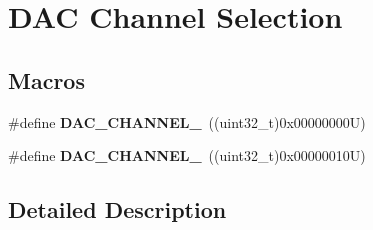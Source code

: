 \hypertarget{group___d_a_c___channel__selection}{}\section{D\+AC Channel Selection}
\label{group___d_a_c___channel__selection}
\subsection*{Macros}
\begin{DoxyCompactItemize}
\item 
\mbox{\label{group___d_a_c___channel__selection_ga3782e2fcffde5a400eb03a70365fdbac}} 
\#define {\bfseries D\+A\+C\+\_\+\+C\+H\+A\+N\+N\+E\+L\+\_}~((uint32\+\_\+t)0x00000000\+U)
\item 
\mbox{\label{group___d_a_c___channel__selection_ga14c86b50131d26813c95a730f45214b8}} 
\#define {\bfseries D\+A\+C\+\_\+\+C\+H\+A\+N\+N\+E\+L\+\_}~((uint32\+\_\+t)0x00000010\+U)
\end{DoxyCompactItemize}


\subsection{Detailed Description}
